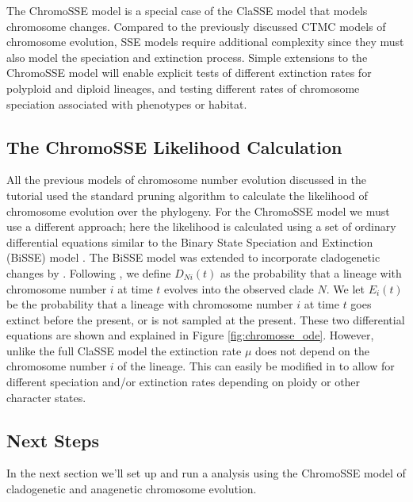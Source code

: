 The ChromoSSE model \citep{freyman2016cladogenetic} is a special case of the ClaSSE model that models chromosome changes.
Compared to the previously discussed CTMC models of chromosome evolution, SSE models require additional complexity since they must also
model the speciation and extinction process.
Simple extensions to the ChromoSSE model will enable explicit 
tests of different extinction rates for polyploid and diploid lineages,
and testing different rates of chromosome speciation associated with phenotypes or habitat.

\subsection{The ChromoSSE Likelihood Calculation}

All the previous models of chromosome number evolution discussed in the tutorial used
the standard pruning algorithm \citep{felsenstein81} to calculate
the likelihood of chromosome evolution over the phylogeny.
For the ChromoSSE model we must use a different approach;
here the likelihood is calculated using a set of ordinary differential
equations similar to the
Binary State Speciation and Extinction (BiSSE) model \citep{maddison2007estimating}.
The BiSSE model was extended to incorporate cladogenetic changes
by \citet{goldberg2012tempo}.
Following \citet{goldberg2012tempo}, we define
$D_{Ni}(t)$ as the probability that a lineage with
chromosome number $i$ at time $t$ evolves into the observed clade $N$.
We let $E_i(t)$ be the probability that a lineage
with chromosome number $i$ at time $t$ goes extinct before the present, or is not sampled at the present.
These two differential equations are shown and explained in Figure \ref{fig:chromosse_ode}.
However, unlike the full ClaSSE model the
extinction rate $\mu$ does not depend on the
chromosome number $i$ of the lineage.
This can easily be modified in \RevBayes to allow for different speciation and/or extinction rates
depending on ploidy or other character states.


\subsection{Next Steps}


In the next section we'll set up and run a \RevBayes analysis using the ChromoSSE model
of cladogenetic and anagenetic chromosome evolution.


\newpage
